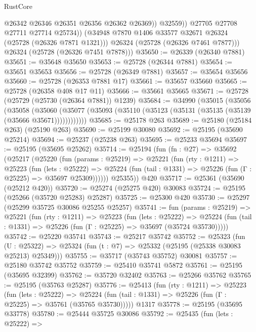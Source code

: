 \begin{lexlean}{RustCore}
\begin{coremodule}
                    @26342
                    @26346
                    @26351
                    @26356
                    @26362
                    @26369))
                @32559))
            @27705
            @27708
            @27711
            @27714
            @25734))
        (@34948 @7870 @1406 @33577 @32671 @26324 (@25728 (@26326 @7871 @1321)))
        @26324
        (@25728 (@26326 @7461 @7877)))
      @26324
      (@25728 (@26326 @7451 @7878)))
@35650 := @26339 (@26340 @7881)
@35651 := @35648 @35650
@35653 := @25728 (@26344 @7881)
@35654 := @35651 @35653
@35656 := @25728 (@26349 @7881)
@35657 := @35654 @35656
@35660 := @25728 (@26353 @7881 @17)
@35661 := @35657 @35660
@35665 := @25728 (@26358 @408 @17 @11)
@35666 := @35661 @35665
@35671 := @25728 (@25729 (@25730 (@26364 @7881)) @1239)
@35684 := @34990
    (@35015
      (@35056
        (@35058
          (@35060 (@35077 (@35093 (@35110 (@35123 (@35131 (@35135 (@35139 (@35666 @35671))))))))))))
@35685 := @25178 @263
@35689 := @25180 (@25184 @263) (@25190 @263)
@35690 := @25199 @30080
@35692 := @25195 (@35690 @25214)
@35694 := @25237 (@25238 @263)
@35695 := @25233 @35694
@35697 := @25195 (@35695 @25262)
@35714 := @25194
    (fun (fn : @27) =>
    @35692
      (@25217
        (@25220
          (fun (params : @25219) =>
          @25221
            (fun (rty : @1211) =>
            @25223
              (fun (lets : @25222) =>
              @25224 (fun (tail : @1331) => @25226 (fun (Γ : @25225) => @35697 @25309))))))
        @25355))
    @420
@35717 := @25361 (@35690 (@25212 @420))
@35720 := @25274 (@25275 @420) @30083
@35724 := @25195 (@25266 (@35720 @25283) @25287)
@35725 := @25300 @420
@35730 := @25297 (@25299 @35725 @30086 @25255 @25257)
@35741 := fun (params : @25219) =>
  @25221
    (fun (rty : @1211) =>
    @25223
      (fun (lets : @25222) =>
      @25224 (fun (tail : @1331) => @25226 (fun (Γ : @25225) => @35697 (@35724 @35730)))))
@35742 := @25220 @35741
@35743 := @25217 @35742
@35752 := @25323
    (fun (U : @25322) => @25324 (fun (t : @7) => @25332 (@25195 (@25338 @30083 @25213) @25349)))
@35755 := @35717 (@35743 @35752) @30081
@35757 := @25180 @35742 @35752
@35759 := @25410 @35741 @5872
@35761 := @25195 (@35695 @32399)
@35762 := @35720 @32402
@35763 := @25266 @35762
@35765 := @25195 (@35763 @25287)
@35776 := @25413
    (fun (rty : @1211) =>
    @25223
      (fun (lets : @25222) =>
      @25224 (fun (tail : @1331) => @25226 (fun (Γ : @25225) => @35761 (@35765 @35730)))))
    @1317
@35778 := @25195 (@35695 @33778)
@35780 := @25444 @35725 @30086
@35792 := @25435
    (fun (lets : @25222) =>

\end{coremodule}
\end{lexlean}
